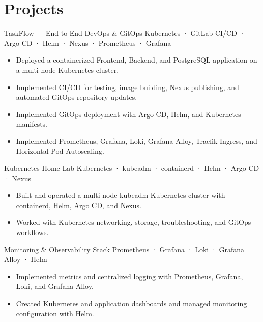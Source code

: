 \section{Projects}

\projectentry
    {TaskFlow — End-to-End DevOps \& GitOps}
    {Kubernetes · GitLab CI/CD · Argo CD · Helm · Nexus · Prometheus · Grafana}

\begin{itemize}
    \item Deployed a containerized Frontend, Backend, and PostgreSQL application on a multi-node Kubernetes cluster.
    \item Implemented CI/CD for testing, image building, Nexus publishing, and automated GitOps repository updates.
    \item Implemented GitOps deployment with Argo CD, Helm, and Kubernetes manifests.
    \item Implemented Prometheus, Grafana, Loki, Grafana Alloy, Traefik Ingress, and Horizontal Pod Autoscaling.
\end{itemize}

\projectentry
    {Kubernetes Home Lab}
    {Kubernetes · kubeadm · containerd · Helm · Argo CD · Nexus}

\begin{itemize}
    \item Built and operated a multi-node kubeadm Kubernetes cluster with containerd, Helm, Argo CD, and Nexus.
    \item Worked with Kubernetes networking, storage, troubleshooting, and GitOps workflows.
\end{itemize}

\projectentry
    {Monitoring \& Observability Stack}
    {Prometheus · Grafana · Loki · Grafana Alloy · Helm}

\begin{itemize}
    \item Implemented metrics and centralized logging with Prometheus, Grafana, Loki, and Grafana Alloy.
    \item Created Kubernetes and application dashboards and managed monitoring configuration with Helm.
\end{itemize}
